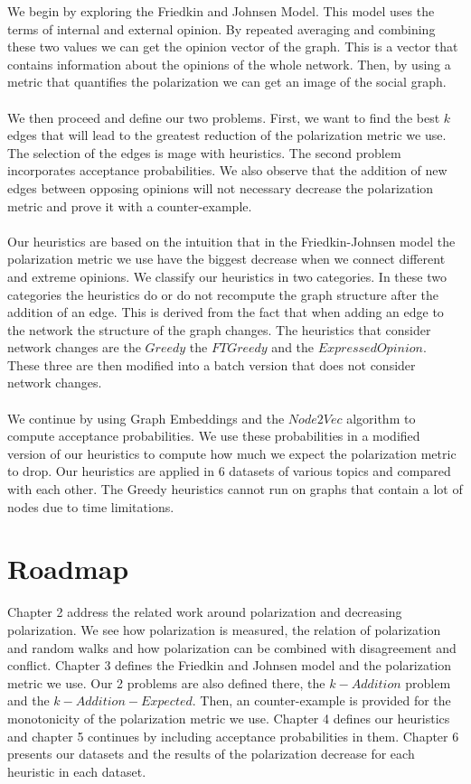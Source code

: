 We begin by exploring the Friedkin and Johnsen Model. This model uses the terms of internal and external opinion. By repeated averaging and combining these two values we can get the opinion vector of the graph.
This is a vector that contains information about the opinions of the whole network. Then, by using a metric that quantifies the polarization we can get an image of the social graph.
\\
\\
We then proceed and define our two problems. First, we want to find the best $k$ edges that will lead to the greatest reduction of the polarization metric we use. The selection of the edges is mage with heuristics. The second problem incorporates acceptance probabilities.
We also observe that the addition of new edges between opposing opinions will not necessary decrease the polarization metric and prove it with a counter-example.
\\
\\
Our heuristics are based on the intuition that in the Friedkin-Johnsen model the polarization metric we use have the biggest decrease when we connect different and extreme opinions. We classify our heuristics in two categories. In these two categories the heuristics do or do not recompute the graph structure after the addition of an edge. This is derived from the fact that when adding an edge to the network the structure of the graph changes. The heuristics that consider network changes are the $Greedy$ the $FTGreedy$ and the $Expressed Opinion$. These three are then modified into a batch version that does not consider network changes.
\\
\\
We continue by using Graph Embeddings and the $Node2Vec$ algorithm to compute acceptance probabilities. We use these probabilities in a modified version of our heuristics to compute how much we expect the polarization metric to drop. Our heuristics are applied in 6 datasets of various topics and compared with each other. The Greedy heuristics cannot run on graphs that contain a lot of nodes due to time limitations.

\section{Roadmap}
\label{sec:roadmap}

Chapter 2 address the related work around polarization and decreasing polarization. We see how polarization is measured, the relation of polarization and random walks and how polarization can be combined with disagreement and conflict. Chapter 3 defines the Friedkin and Johnsen model and the polarization metric we use. Our 2 problems are also defined there, the $k-Addition$ problem and the $k-Addition-Expected$. Then, an counter-example is provided for the monotonicity of the polarization metric we use. Chapter 4 defines our heuristics and chapter 5 continues by including acceptance probabilities in them. Chapter 6 presents our datasets and the results of the polarization decrease for each heuristic in each dataset. 




